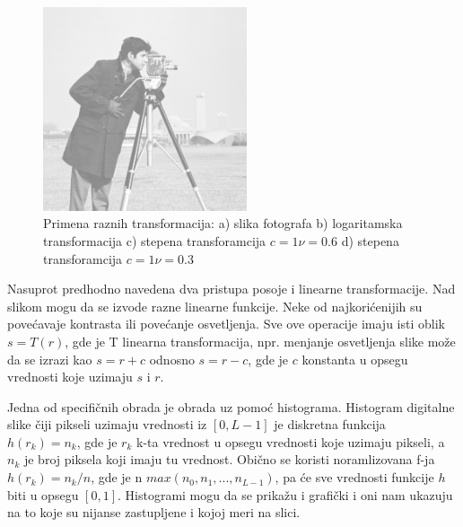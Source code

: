 \documentclass[a4paper,12pt,titlepage]{article}
\begin{document}
\begin{figure}[ht!]
\includegraphics[width=60mm]{img/imgPow2.png}
\caption{Primena raznih transformacija: a) slika fotografa b) logaritamska transformacija c) stepena transforamcija $c = 1 \nu = 0.6$ d) stepena transforamcija $c = 1 \nu = 0.3$}
\label{overflow}
\end{figure} 

Nasuprot predhodno navedena dva pristupa posoje i linearne transformacije. Nad slikom mogu da se izvode razne linearne funkcije. Neke od najkorićenijih su povećavaje kontrasta ili povećanje osvetljenja. Sve ove operacije imaju isti oblik $s = T(r)$, gde je T linearna transformacija, npr. menjanje osvetljenja slike može da se izrazi kao $s = r + c$ odnosno $s = r - c$, gde je $c$ konstanta u opsegu vrednosti koje uzimaju $s$ i $r$. 

Jedna od specifičnih obrada je obrada uz pomoć histograma. Histogram digitalne slike čiji pikseli uzimaju vrednosti iz $[0, L - 1]$ je diskretna funkcija $h(r_{k}) = n_{k}$, gde je $r_{k}$ k-ta vrednost u opsegu vrednosti koje uzimaju pikseli, a $n_{k}$ je broj piksela koji imaju tu vrednost. Obično se koristi noramlizovana f-ja $h(r_{k}) = n_{k}/n$, gde je n $max(n_{0}, n_{1}, ... , n_{L - 1})$, pa će sve vrednosti funkcije $h$ biti u opsegu $[0, 1]$. Histogrami mogu da se prikažu i grafički i oni nam ukazuju na to koje su nijanse zastupljene i kojoj meri na slici.  
\end{document}
